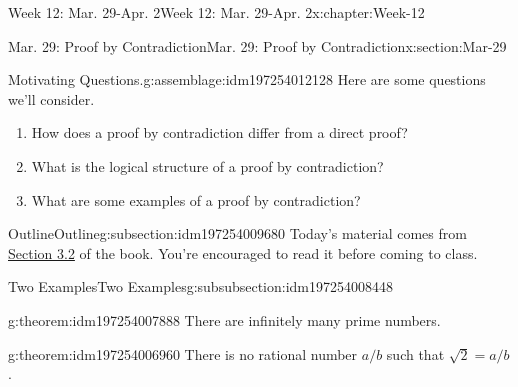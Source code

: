 \documentclass[oneside,10pt,]{book}
\numberwithin{equation}{section}
\begin{document}
\begin{chapterptx}{Week 12: Mar. 29-Apr. 2}{}{Week 12: Mar. 29-Apr. 2}{}{}{x:chapter:Week-12}
%
%
\typeout{************************************************}
\typeout{************************************************}
%
\begin{sectionptx}{Mar. 29: Proof by Contradiction}{}{Mar. 29: Proof by Contradiction}{}{}{x:section:Mar-29}
\begin{introduction}{}%
\begin{assemblage}{Motivating Questions.}{g:assemblage:idm197254012128}%
Here are some questions we'll consider. %
\begin{enumerate}
\item{}How does a proof by contradiction differ from a direct proof?%
\item{}What is the logical structure of a proof by contradiction?%
\item{}What are some examples of a proof by contradiction?%
\end{enumerate}
%
\end{assemblage}
\end{introduction}%
%
%
\typeout{************************************************}
\typeout{************************************************}
%
\begin{subsectionptx}{Outline}{}{Outline}{}{}{g:subsection:idm197254009680}
Today's material comes from \href{http://discrete.openmathbooks.org/dmoi3/sec_logic-proofs.html}{Section 3.2} of the book. You're encouraged to read it before coming to class.%
%
%
\typeout{************************************************}
\typeout{************************************************}
%
\begin{subsubsectionptx}{Two Examples}{}{Two Examples}{}{}{g:subsubsection:idm197254008448}
\begin{theorem}{}{}{g:theorem:idm197254007888}%
There are infinitely many prime numbers.%
\end{theorem}
\begin{theorem}{}{}{g:theorem:idm197254006960}%
There is no rational number \(a/b\) such that \(\sqrt{2} = a/b\).%
\end{theorem}
\end{subsubsectionptx}
%
%
\typeout{************************************************}
\typeout{************************************************}

\end{subsectionptx}
\end{sectionptx}
\end{chapterptx}
\end{document}
